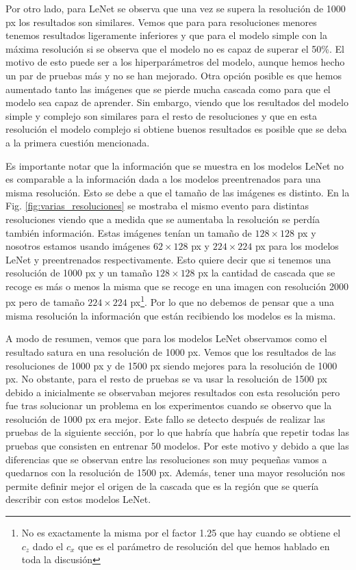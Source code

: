 \documentclass[a4paper,12pt,twoside,titlepage]{article}
\begin{document}
Por otro lado, para LeNet se observa que una vez se supera la resolución de 1000 px los resultados son similares. Vemos que para para resoluciones menores tenemos resultados ligeramente inferiores y que para el modelo simple con la máxima resolución si se observa que el modelo no es capaz de superar el 50\%. El motivo de esto puede ser a los hiperparámetros del modelo, aunque hemos hecho un par de pruebas más y no se han mejorado. Otra opción posible es que hemos aumentado tanto las imágenes que se pierde mucha cascada como para que el modelo sea capaz de aprender. Sin embargo, viendo que los resultados del modelo simple y complejo son similares para el resto de resoluciones y que en esta resolución el modelo complejo si obtiene buenos resultados es posible que se deba a la primera cuestión mencionada.

Es importante notar que la información que se muestra en los modelos LeNet no es comparable a la información dada a los modelos preentrenados para una misma resolución. Esto se debe a que el tamaño de las imágenes es distinto. En la Fig. \ref{fig:varias_resoluciones} se mostraba el mismo evento para distintas resoluciones viendo que a medida que se aumentaba la resolución se perdía también información. Estas imágenes tenían un tamaño de $128\times128$ px y nosotros estamos usando imágenes $62\times128$ px y $224\times224$ px para los modelos LeNet y preentrenados respectivamente. Esto quiere decir que si tenemos una resolución de 1000 px y un tamaño $128\times128$ px la cantidad de cascada que se recoge es más o menos la misma que se recoge en una imagen con resolución 2000 px pero de tamaño $224\times224$ px\footnote{No es exactamente la misma por el factor 1.25 que hay cuando se obtiene el $c_z$ dado el $c_x$ que es el parámetro de resolución del que hemos hablado en toda la discusión}. Por lo que no debemos de pensar que a una misma resolución la información que están recibiendo los modelos es la misma.

A modo de resumen, vemos que para los modelos LeNet observamos como el resultado satura en una resolución de 1000 px. Vemos que los resultados de las resoluciones de 1000 px y de 1500 px siendo mejores para la resolución de 1000 px. No obstante, para el resto de pruebas se va usar la resolución de 1500 px debido a inicialmente se observaban mejores resultados con esta resolución pero fue tras solucionar un problema en los experimentos cuando se observo que la resolución de 1000 px era mejor. Este fallo se detecto después de realizar las pruebas de la siguiente sección, por lo que habría que habría que repetir todas las pruebas que consisten en entrenar 50 modelos. Por este motivo y debido a que las diferencias que se observan entre las resoluciones son muy pequeñas vamos a quedarnos con la resolución de 1500 px. Además, tener una mayor resolución nos permite definir mejor el origen de la cascada que es la región que se quería describir con estos modelos LeNet.  
\end{document}
